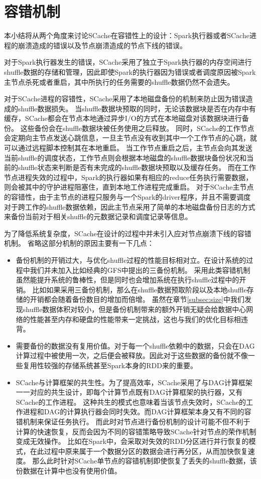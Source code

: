 \section{容错机制}

本小结将从两个角度来讨论SCache在容错性上的设计：Spark执行器或者SCache进程的崩溃造成的错误以及节点崩溃造成的节点下线的错误。

对于Spark执行器发生的错误，SCache采用了独立于Spark执行器的内存空间进行shuffle数据的存储和管理，因此即使Spark的执行器因为错误或者调度原因被Spark主节点杀死或者重启，其中所执行的任务需要的shuffle数据仍然不会遗失。

对于SCache进程的容错性，SCache采用了本地磁盘备份的机制来防止因为错误造成的shuffle数据损失。
当shuffle数据块预取的同时，无论该数据块是否在内存中有缓存，SCache都会在节点本地通过异步I/O的方式在本地磁盘对该数据块进行备份。
这些备份会在shuffle数据块被任务使用之后释放。
同时，SCache的工作节点会定期向主节点发送心跳信息，一旦主节点没有收到其中一个工作节点的心跳，就可以通过远程脚本控制其在本地重启。
当工作节点重启之后，主节点会向其发送当前shuffle的调度状态，工作节点则会根据本地磁盘的shuffle数据块备份状况和当前的shuffle状态来判断是否有未完成的shuffle数据块预取以及缓存任务。
而在工作节点进程失效的过程中，Spark的执行器如果有相应的reduce任务执行需要数据，则会被其中的守护进程阻塞住，直到本地工作进程完成重启。
对于SCache主节点的容错性，由于主节点的进程只服务与一个Spark的driver程序，并且不需要调度对于跨工作的shuffle数据依赖，因此主节点采用了简单的本地磁盘备份日志的方式来备份当前对于相关shuffle的元数据记录和调度记录等信息。

为了降低系统复杂度，SCache在设计的过程中并未引入应对节点崩溃下线的容错机制。
省略这部分机制的原因主要有一下几点：
\begin{itemize}
    \item 备份机制的开销过大，与优化shuffle过程的性能目标相对立。在设计系统的过程中我们并未加入比如经典的GFS\cite{gfs}中提出的三备份机制。
    采用此类容错机制虽然能提升系统的鲁棒性，但是同时也会增加系统在执行shuffle过程中的开销。
    比如如果采用三备份机制，那么在shuffle数据预取阶段以及本地shuffle存储的开销都会随着备份数目的增加而倍增。
    虽然在章节\ref{subsec:size}中我们发现shuffle数据体积对较小，但是备份机制带来的额外开销无疑会给数据中心网络的性能甚至内存和硬盘的性能带来一定挑战，这也与我们的优化目标相违背。
    \item 需要备份的数据没有复用价值。对于每一个shuffle依赖中的数据，只会在DAG计算过程中被使用一次，之后便会被释放。因此对于这些数据的备份就不像一些复用性较强的存储系统甚至Spark本身的RDD来的重要。
    \item SCache与计算框架的共生性。为了提高效率，SCache采用了与DAG计算框架一一对应的共生设计，即每个计算节点既有DAG计算框架的执行器，又有SCache的工作进程。
    这种共生的模式也意味着当该节点失效时，SCache的工作进程和DAG的计算执行器会同时失效。而DAG计算框架本身又有不同的容错机制来保证任务执行。
    而此时对节点进行备份机制的设计可能不但不利于计算的快速恢复，反而会因为不同的容错策略导致SCache针对节点的荣作机制变成无效操作。
    比如在Spark中，会采取对失效的RDD分区进行并行恢复的模式，在此过程中原来属于一个数据分区的数据会进行再分区，从而加快恢复速度。
    那么此时针对SCache单节点的容错机制即使恢复了丢失的shuffle数据，该份数据在计算中也没有使用价值。
\end{itemize}

